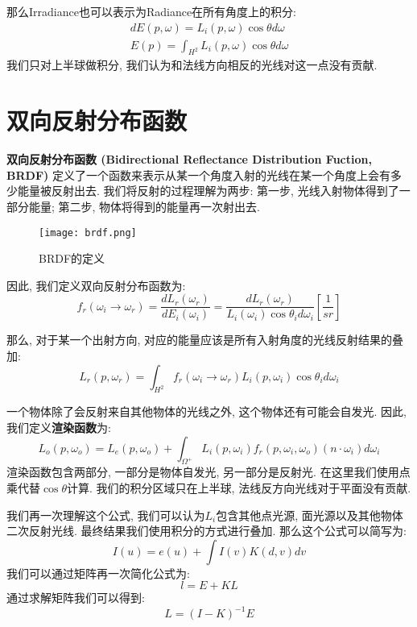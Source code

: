 那么Irradiance也可以表示为Radiance在所有角度上的积分: 
\begin{equation}
	\begin{split}
		dE(p,\omega)=L_i(p,\omega)\cos\theta d\omega\\
		E(p)=\int_{H^2}L_i(p,\omega)\cos\theta d\omega
	\end{split}
\end{equation}我们只对上半球做积分, 我们认为和法线方向相反的光线对这一点没有贡献. 

\section{双向反射分布函数}
\textbf{双向反射分布函数 (Bidirectional Reflectance Distribution Fuction, BRDF) }定义了一个函数来表示从某一个角度入射的光线在某一个角度上会有多少能量被反射出去. 我们将反射的过程理解为两步: 第一步, 光线入射物体得到了一部分能量; 第二步, 物体将得到的能量再一次射出去. 

\begin{figure}[H]
	\centering
	\texttt{[image: brdf.png]}
	\caption{BRDF的定义}
	\label{fig:brdf}
\end{figure}

因此, 我们定义双向反射分布函数为: 
\begin{equation}
	f_r(\omega_i\rightarrow \omega_r)=\frac{dL_r(\omega_r)}{dE_i(\omega_i)}=\frac{dL_r(\omega_r)}{L_i(\omega_i)\cos\theta_i d\omega_i}[\frac{1}{sr}]
\end{equation}

那么, 对于某一个出射方向, 对应的能量应该是所有入射角度的光线反射结果的叠加: 
\begin{equation}
	L_r(p,\omega_r)=\int_{H^2}f_r(\omega_i\rightarrow \omega_r)L_i(p,\omega_i)\cos\theta_id\omega_i
\end{equation}

一个物体除了会反射来自其他物体的光线之外, 这个物体还有可能会自发光. 因此, 我们定义\textbf{渲染函数}为: 
\begin{equation}
	L_o(p,\omega_o)=L_e(p,\omega_o)+\int_{\Omega^+}L_i(p,\omega_i)f_r(p,\omega_i,\omega_o)(n\cdot \omega_i)d\omega_i
\end{equation}渲染函数包含两部分, 一部分是物体自发光, 另一部分是反射光. 在这里我们使用点乘代替$\cos\theta$计算. 我们的积分区域只在上半球, 法线反方向光线对于平面没有贡献. 

我们再一次理解这个公式, 我们可以认为$L_i$包含其他点光源, 面光源以及其他物体二次反射光线. 最终结果我们使用积分的方式进行叠加. 那么这个公式可以简写为: 
\begin{equation}
	I(u)=e(u)+\int I(v)K(d,v)dv
\end{equation} 我们可以通过矩阵再一次简化公式为: 
\begin{equation}
	l=E+KL
\end{equation}
通过求解矩阵我们可以得到: 
\begin{equation}
	L=(I-K)^{-1}E
\end{equation}

